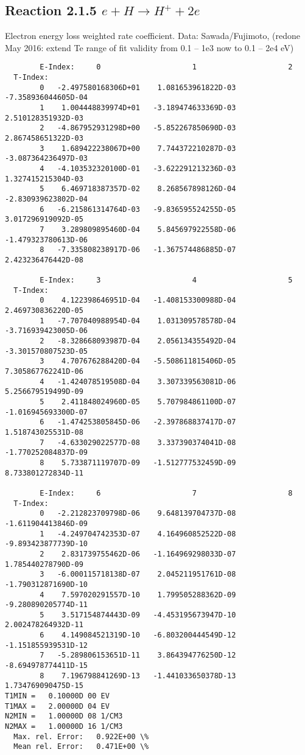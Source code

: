 \documentclass[12pt,dvipdfmx]{article}
\begin{document}
\subsection{
Reaction 2.1.5  $ e + H \rightarrow H^+ + 2e $
}
Electron energy loss weighted rate coefficient. Data: Sawada/Fujimoto, \cite{kn:Sawada}
(redone May 2016: extend Te range of fit validity from 0.1 -- 1e3 now to 0.1 -- 2e4 eV)

\begin{small}\begin{verbatim}
        E-Index:     0                     1                     2
  T-Index:
        0   -2.497580168306D+01    1.081653961822D-03   -7.358936044605D-04
        1    1.004448839974D+01   -3.189474633369D-03    2.510128351932D-03
        2   -4.867952931298D+00   -5.852267850690D-03    2.867458651322D-03
        3    1.689422238067D+00    7.744372210287D-03   -3.087364236497D-03
        4   -4.103532320100D-01   -3.622291213236D-03    1.327415215304D-03
        5    6.469718387357D-02    8.268567898126D-04   -2.830939623802D-04
        6   -6.215861314764D-03   -9.836595524255D-05    3.017296919092D-05
        7    3.289809895460D-04    5.845697922558D-06   -1.479323780613D-06
        8   -7.335808238917D-06   -1.367574486885D-07    2.423236476442D-08

        E-Index:     3                     4                     5
  T-Index:
        0    4.122398646951D-04   -1.408153300988D-04    2.469730836220D-05
        1   -7.707040988954D-04    1.031309578578D-04   -3.716939423005D-06
        2   -8.328668093987D-04    2.056134355492D-04   -3.301570807523D-05
        3    4.707676288420D-04   -5.508611815406D-05    7.305867762241D-06
        4   -1.424078519508D-04    3.307339563081D-06    5.256679519499D-09
        5    2.411848024960D-05    5.707984861100D-07   -1.016945693300D-07
        6   -1.474253805845D-06   -2.397868837417D-07    1.518743025531D-08
        7   -4.633029022577D-08    3.337390374041D-08   -1.770252084837D-09
        8    5.733871119707D-09   -1.512777532459D-09    8.733801272834D-11

        E-Index:     6                     7                     8
  T-Index:
        0   -2.212823709798D-06    9.648139704737D-08   -1.611904413846D-09
        1   -4.249704742353D-07    4.164960852522D-08   -9.893423877739D-10
        2    2.831739755462D-06   -1.164969298033D-07    1.785440278790D-09
        3   -6.000115718138D-07    2.045211951761D-08   -1.790312871690D-10
        4    7.597020291557D-10    1.799505288362D-09   -9.280890205774D-11
        5    3.517154874443D-09   -4.453195673947D-10    2.002478264932D-11
        6    4.149084521319D-10   -6.803200444549D-12   -1.151855939531D-12
        7   -5.289806153651D-11    3.864394776250D-12   -8.694978774411D-15
        8    7.196798841269D-13   -1.441033650378D-13    1.734769090475D-15
T1MIN =   0.10000D 00 EV
T1MAX =   2.00000D 04 EV
N2MIN =   1.00000D 08 1/CM3
N2MAX =   1.00000D 16 1/CM3
  Max. rel. Error:   0.922E+00 \%
  Mean rel. Error:   0.471E+00 \%


\end{verbatim}\end{small}
\end{document}
